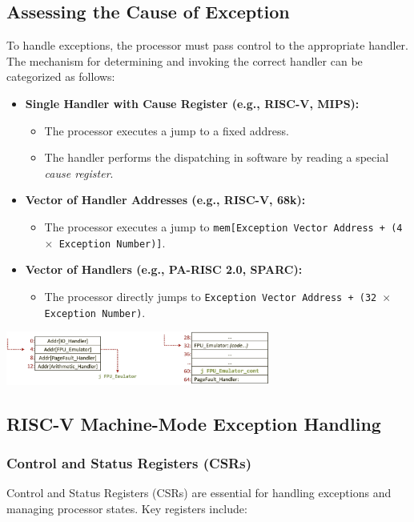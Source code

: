 \subsection{Assessing the Cause of Exception}
To handle exceptions, the processor must pass control to the appropriate handler. The mechanism for determining and invoking the correct handler can be categorized as follows:
\begin{itemize}
    \item[] \textbf{Single Handler with Cause Register (e.g., RISC-V, MIPS):}
    \begin{itemize}
        \item The processor executes a jump to a fixed address.
        \item The handler performs the dispatching in software by reading a special \textit{cause register}.
    \end{itemize}
    \item[] \textbf{Vector of Handler Addresses (e.g., RISC-V, 68k):}
    \begin{itemize}
        \item The processor executes a jump to \texttt{mem[Exception Vector Address + (4 $\times$ Exception Number)]}.
    \end{itemize}
    \item[] \textbf{Vector of Handlers (e.g., PA-RISC 2.0, SPARC):}
    \begin{itemize}
        \item The processor directly jumps to \texttt{Exception Vector Address + (32 $\times$ Exception Number)}.
    \end{itemize}
\end{itemize}
\begin{center}
    \includegraphics[width=0.65\textwidth]{chapters/chapter2d/images/position.png}
\end{center}
\subsection{RISC-V Machine-Mode Exception Handling}
\subsubsection{Control and Status Registers (CSRs)}
Control and Status Registers (CSRs) are essential for handling exceptions and managing processor states. Key registers include:

